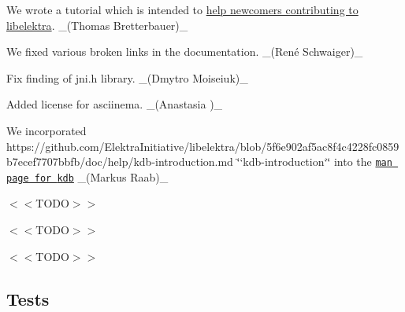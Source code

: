 \begin{DoxyItemize}
\item We wrote a tutorial which is intended to \hyperlink{doc_tutorials_contributing-clion_md}{help newcomers contributing to libelektra}. \+\_\+(\+Thomas Bretterbauer)\+\_\+
\item We fixed various broken links in the documentation. \+\_\+(René Schwaiger)\+\_\+
\item Fix finding of jni.\+h library. \+\_\+(\+Dmytro Moiseiuk)\+\_\+
\item Added license for asciinema. \+\_\+(Anastasia )\+\_\+
\item We incorporated https\+://github.com/\+Elektra\+Initiative/libelektra/blob/5f6e902af5ac8f4c4228fc0859b7ecef7707bbfb/doc/help/kdb-\/introduction.\+md \char`\"{}`kdb-\/introduction`\char`\"{} into the \href{https://www.libelektra.org/manpages/kdb}{\tt man page for {\ttfamily kdb}} \+\_\+(\+Markus Raab)\+\_\+
\item $<$$<$\+T\+O\+D\+O$>$$>$
\item $<$$<$\+T\+O\+D\+O$>$$>$
\item $<$$<$\+T\+O\+D\+O$>$$>$
\end{DoxyItemize}

\subsection*{Tests}


